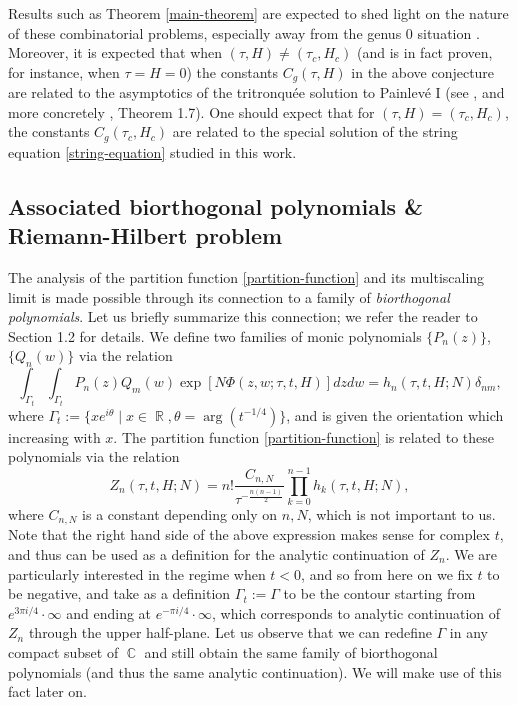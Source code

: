 \documentclass[usenames,dvipsnames]{article}
\theoremstyle{definition}
\DeclareMathOperator{\CC}{\mathbb{C}}
\DeclareMathOperator{\RR}{\mathbb{R}}
\numberwithin{equation}{section}
\numberwithin{figure}{section}
\begin{document}
            
Results such as Theorem \ref{main-theorem} are expected to shed light on the nature of these combinatorial problems, especially away from the genus $0$ situation \cite{PGZ}. Moreover, it is expected that when $(\tau,H) \neq (\tau_c,H_c)$ (and is in fact proven, for instance, when $\tau=H=0$) the constants $C_g(\tau,H)$ in the above conjecture are related to the asymptotics of the tritronqu\'{e}e solution to Painlev\'{e} I (see \cite{GJ,BenderGaoRichmond}, and more concretely \cite{BGM}, Theorem  1.7). One should expect that for $(\tau,H) = (\tau_c,H_c)$, the constants $C_g(\tau_c,H_c)$ are related to the special solution of the string equation \eqref{string-equation} studied in this work.


\subsection{Associated biorthogonal polynomials \& Riemann-Hilbert problem}
The analysis of the partition function \eqref{partition-function} and its multiscaling limit is made possible through its connection to a family of
\textit{biorthogonal polynomials}. Let us briefly summarize this connection; we refer the reader to \cite{DHL1} Section 1.2 for details. We define
two families of monic polynomials $\{P_n(z)\}$, $\{Q_n(w)\}$ via the relation
    \begin{equation}\label{BOP-def}
        \int_{\Gamma_t}\int_{\Gamma_t} P_n(z)Q_m(w) \exp\left[N\Phi(z,w;\tau,t,H)\right]dzdw = h_{n}(\tau,t,H;N)\delta_{nm},
    \end{equation}
where $\Gamma_t:=\{xe^{i\theta}\mid x\in \RR, \theta = \arg (t^{-1/4})\}$, and is given the orientation which increasing with $x$. The partition function \eqref{partition-function} is related to these polynomials via the relation
    \begin{equation}\label{BOP-partition-function}
        Z_n(\tau,t,H;N) = n!\frac{C_{n,N}}{\tau^{-\frac{n(n-1)}{2}}} \prod_{k=0}^{n-1}h_k(\tau,t,H;N),
    \end{equation}
where $C_{n,N}$ is a constant depending only on $n,N$, which is not important to us. Note that the right hand side of the above expression makes sense
for complex $t$, and thus can be used as a definition for the analytic continuation of $Z_n$. We are particularly interested in the regime when $t<0$, and so from here on we fix $t$ to be negative, and take as a definition $\Gamma_t:=\Gamma$ to be the contour starting from $e^{3\pi i/4}\cdot\infty$ and ending at $e^{-\pi i/4}\cdot \infty$, which corresponds to analytic continuation of $Z_n$ through the upper half-plane. Let us observe that we can redefine $\Gamma$ in any compact subset of $\CC$ and still obtain the same family of biorthogonal polynomials (and thus the same analytic continuation). We will make use of this fact later on.
\end{document}
